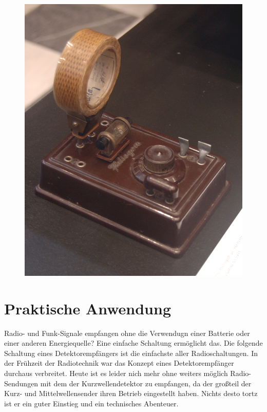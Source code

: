 \begin{figure}
 \vspace{-6cm}
  \includegraphics[scale=0.1]{Kurzwellendetektor/Bilder/Heliogen_medium_wave_galena_radio.JPG}
 \vspace{-6cm}
\end{figure}

\section{Praktische Anwendung}

Radio- und Funk-Signale empfangen ohne die Verwendugn einer Batterie oder einer anderen Energiequelle? Eine einfache Schaltung ermöglicht das. Die folgende Schaltung eines Detektorempfängers ist die einfachste aller Radioschaltungen. In der Frühzeit der Radiotechnik war das Konzept eines Detektorempfänger durchaus verbreitet. Heute ist es leider nich mehr ohne weiters möglich Radio-Sendungen mit dem der Kurzwellendetektor zu empfangen, da der großteil der Kurz- und Mittelwellensender ihren Betrieb eingestellt haben. Nichts desto tortz ist er ein guter Einstieg und ein technisches Abenteuer.


